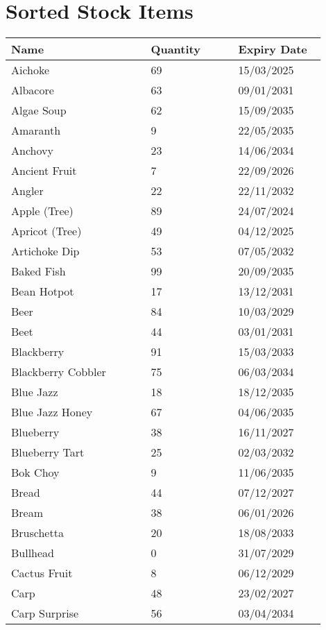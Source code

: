 \documentclass{article}
\begin{document}
\section*{Sorted Stock Items}
\begin{longtable}{|p{0.4\linewidth}|p{0.25\linewidth}|p{0.25\linewidth}|}\hline
\textbf{Name} & \textbf{Quantity} & \textbf{Expiry Date}\\
\hline
Aichoke & 69 & 15/03/2025 \\
\hline
Albacore & 63 & 09/01/2031 \\
\hline
Algae Soup & 62 & 15/09/2035 \\
\hline
Amaranth & 9 & 22/05/2035 \\
\hline
Anchovy & 23 & 14/06/2034 \\
\hline
Ancient Fruit & 7 & 22/09/2026 \\
\hline
Angler & 22 & 22/11/2032 \\
\hline
Apple (Tree) & 89 & 24/07/2024 \\
\hline
Apricot (Tree) & 49 & 04/12/2025 \\
\hline
Artichoke Dip & 53 & 07/05/2032 \\
\hline
Baked Fish & 99 & 20/09/2035 \\
\hline
Bean Hotpot & 17 & 13/12/2031 \\
\hline
Beer & 84 & 10/03/2029 \\
\hline
Beet & 44 & 03/01/2031 \\
\hline
Blackberry & 91 & 15/03/2033 \\
\hline
Blackberry Cobbler & 75 & 06/03/2034 \\
\hline
Blue Jazz & 18 & 18/12/2035 \\
\hline
Blue Jazz Honey & 67 & 04/06/2035 \\
\hline
Blueberry & 38 & 16/11/2027 \\
\hline
Blueberry Tart & 25 & 02/03/2032 \\
\hline
Bok Choy & 9 & 11/06/2035 \\
\hline
Bread & 44 & 07/12/2027 \\
\hline
Bream & 38 & 06/01/2026 \\
\hline
Bruschetta & 20 & 18/08/2033 \\
\hline
Bullhead & 0 & 31/07/2029 \\
\hline
Cactus Fruit & 8 & 06/12/2029 \\
\hline
Carp & 48 & 23/02/2027 \\
\hline
Carp Surprise & 56 & 03/04/2034 \\

\end{longtable}
\end{document}
